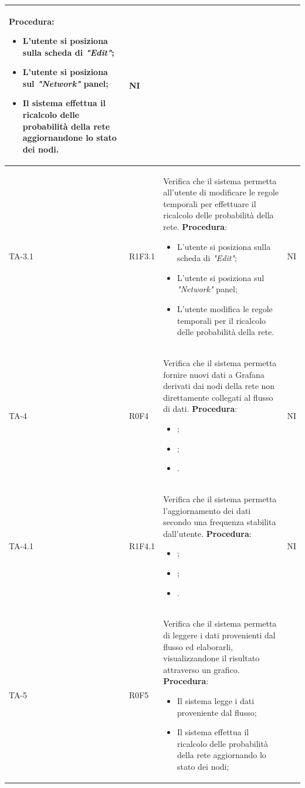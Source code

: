 \begin{longtable}{|C{2.5cm}|C{2.5cm}|L{6.5cm}|C{1.5cm}|}
	\textbf{Procedura}:
	\begin{itemize}		
		\item L'utente si posiziona sulla scheda di \emph{"Edit"};
		\item L'utente si posiziona sul \emph{"Network"} panel;
		\item Il sistema effettua il ricalcolo delle probabilità della rete aggiornandone lo stato dei nodi.
	\end{itemize}	
	 & {NI}\\
	\hline
	{TA-3.1} & {R1F3.1} & 
	Verifica che il sistema permetta all'utente di modificare le regole temporali per effettuare il ricalcolo delle probabilità della rete.
	\textbf{Procedura}:
	\begin{itemize}		
		\item L'utente si posiziona sulla scheda di \emph{"Edit"};
		\item L'utente si posiziona sul \emph{"Network"} panel;
		\item L'utente modifica le regole temporali per il ricalcolo delle probabilità della rete.
	\end{itemize}
	 & {NI}\\
	\hline
	{TA-4} & {R0F4} & 
	Verifica che il sistema permetta fornire nuovi dati a Grafana derivati dai nodi
	della rete non direttamente collegati al flusso di
	dati.
	\textbf{Procedura}:
	\begin{itemize}		
		\item ;
		\item ;
		\item .
	\end{itemize}
	 & {NI}\\
	\hline
	{TA-4.1} & {R1F4.1} & 
	Verifica che il sistema permetta l'aggiornamento dei dati secondo una frequenza stabilita dall'utente.
	\textbf{Procedura}:
	\begin{itemize}		
		\item ;
		\item ;
		\item .
	\end{itemize}
	& {NI}\\
	\hline
	{TA-5} & {R0F5} & 
	Verifica che il sistema permetta di leggere i dati provenienti dal flusso ed elaborarli, visualizzandone il risultato attraverso un grafico.
	\textbf{Procedura}:
	\begin{itemize}		
		\item Il sistema legge i dati proveniente dal flusso;
		\item Il sistema effettua il ricalcolo delle probabilità della rete aggiornando lo stato dei nodi;

\end{itemize}
\end{longtable}
